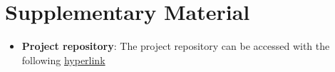 \documentclass[10pt,twocolumn,letterpaper]{article}
\begin{document}
\section{Supplementary Material}

\begin{itemize}
    \item \textbf{Project repository}: The project repository can be accessed with the following \href{https://github.com/GLGDLY/ELEC4240_project}{hyperlink}
\end{itemize}

{\small


}
\end{document}

